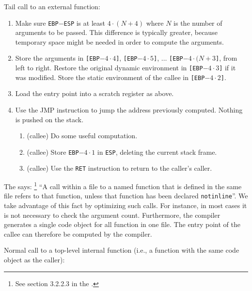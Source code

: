 Tail call to an external function:

\begin{enumerate}
\item Make sure \texttt{EBP}$-$\texttt{ESP} is at least $4 \cdot (N +
  4)$ where $N$ is the number of arguments to be passed.  This
  difference is typically greater, because temporary space might be
  needed in order to compute the arguments.
\item Store the arguments in
  \texttt{[EBP$- 4 \cdot 4$]},
  \texttt{[EBP$- 4 \cdot 5$]},
  $\ldots$
  \texttt{[EBP$- 4 \cdot (N + 3$]},
  from left to right.
  Restore the original dynamic environment in
  \texttt{[EBP$- 4 \cdot 3$]}
  if it was modified.  Store the static environment of the callee in
  \texttt{[EBP$- 4 \cdot 2$]}.
\item Load the entry point into a scratch register as above.
\item Use the JMP instruction to jump the address previously computed.
  Nothing is pushed on the stack.
  \begin{enumerate}
  \item (callee) Do some useful computation.
  \item (callee) Store \texttt{EBP$- 4 \cdot 1$} in \texttt{ESP},
    deleting the current stack frame.
  \item (callee) Use the \texttt{RET} instruction to return to the
    caller's caller.
  \end{enumerate}
\end{enumerate}

The \hs{} says:%
\footnote{See section 3.2.2.3 in the \hs{}.}
``A call within a file to a named function that is defined in the same
file refers to that function, unless that function has been declared
\texttt{notinline}''.  We take advantage of this fact by optimizing
such calls.  For instance, in most cases it is not necessary to check
the argument count.  Furthermore, the compiler generates a single code
object for all function in one file.  The entry point of the callee
can therefore be computed by the compiler.

Normal call to a top-level internal function (i.e., a function with
the same code object as the caller):

